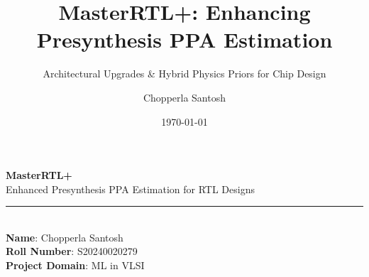 \documentclass[aspectratio=169,10pt]{beamer}
\title{\textbf{MasterRTL+: Enhancing Presynthesis PPA Estimation}}
\subtitle{Architectural Upgrades \& Hybrid Physics Priors for Chip Design}
\author{Chopperla Santosh}
\date{\today}
\begin{document}
\begin{frame}[plain]
    \vspace{1.4cm}
    {\huge \textbf{\color{SageGreen}MasterRTL+}}\\[0.25cm]
    {\large \color{DeepCharcoal}Enhanced Presynthesis PPA Estimation for RTL Designs}\\[0.4cm]
    {\color{SageGreen!30}\rule{0.6\textwidth}{1.0pt}}\\[0.7cm]

    \small
    \textbf{Name}: Chopperla Santosh\\[0.15cm]
    \textbf{Roll Number}: S20240020279\\[0.15cm]
    \textbf{Project Domain}: ML in VLSI
\end{frame}
\end{document}
